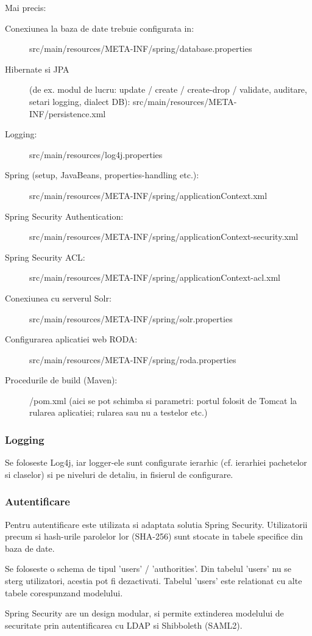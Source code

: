 Mai precis:
\begin{description}
\item[Conexiunea la baza de date trebuie configurata in:]
src/main/resources/META-INF/spring/database.properties
\item[Hibernate si JPA] (de ex. modul de lucru: update / create / create-drop /
validate, auditare, setari logging, dialect DB):
src/main/resources/META-INF/persistence.xml
\item[Logging:]
src/main/resources/log4j.properties
\item[Spring (setup, JavaBeans, properties-handling etc.):]
src/main/resources/META-INF/spring/applicationContext.xml
\item[Spring Security Authentication:]
src/main/resources/META-INF/spring/applicationContext-security.xml
\item[Spring Security ACL:]
src/main/resources/META-INF/spring/applicationContext-acl.xml
\item[Conexiunea cu serverul Solr:]
src/main/resources/META-INF/spring/solr.properties
\item[Configurarea aplicatiei web RODA:]
src/main/resources/META-INF/spring/roda.properties
\item[Procedurile de build (Maven):]
/pom.xml
(aici se pot schimba si parametri: portul folosit de Tomcat la rularea aplicatiei; rularea sau nu a testelor etc.)
\end{description}

\subsubsection{Logging}
Se foloseste Log4j, iar logger-ele sunt configurate ierarhic (cf. ierarhiei
pachetelor si claselor) si pe niveluri de detaliu, in fisierul de
configurare.

\subsubsection{Autentificare}
Pentru autentificare este utilizata si adaptata solutia Spring Security.
Utilizatorii precum si hash-urile parolelor lor (SHA-256) sunt stocate in
tabele specifice din baza de date.

Se foloseste o schema de tipul 'users' / 'authorities'.
Din tabelul 'users' nu se sterg utilizatori, acestia pot fi dezactivati.
Tabelul 'users' este relationat cu alte tabele corespunzand modelului.

Spring Security are un design modular, si permite extinderea modelului de
securitate prin autentificarea cu LDAP si Shibboleth (SAML2).

